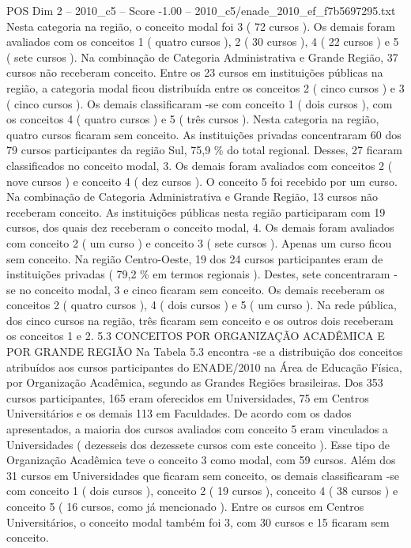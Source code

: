 \begin{textsample}{POS Dim 2 – 2010\_c5 – Score -1.00 – 2010\_c5/enade\_2010\_ef\_f7b5697295.txt}
Nesta categoria na região, o conceito modal foi 3 ( 72 cursos ).
Os demais foram avaliados com os conceitos 1 ( quatro cursos ), 2 ( 30 cursos ), 4 ( 22 cursos ) e 5 ( sete cursos ).
Na combinação de Categoria Administrativa e Grande Região, 37 cursos não receberam conceito.
Entre os 23 cursos em instituições públicas na região, a categoria modal ficou distribuída entre os conceitos 2 ( cinco cursos ) e 3 ( cinco cursos ).
Os demais classificaram -se com conceito 1 ( dois cursos ), com os conceitos 4 ( quatro cursos ) e 5 ( três cursos ).
Nesta categoria na região, quatro cursos ficaram sem conceito.
As instituições privadas concentraram 60 dos 79 cursos participantes da região Sul, 75,9 \% do total regional.
Desses, 27 ficaram classificados no conceito modal, 3.
Os demais foram avaliados com conceitos 2 ( nove cursos ) e conceito 4 ( dez cursos ).
O conceito 5 foi recebido por um curso.
Na combinação de Categoria Administrativa e Grande Região, 13 cursos não receberam conceito.
As instituições públicas nesta região participaram com 19 cursos, dos quais dez receberam o conceito modal, 4.
Os demais foram avaliados com conceito 2 ( um curso ) e conceito 3 ( sete cursos ).
Apenas um curso ficou sem conceito.
Na região Centro-Oeste, 19 dos 24 cursos participantes eram de instituições privadas ( 79,2 \% em termos regionais ).
Destes, sete concentraram -se no conceito modal, 3 e cinco ficaram sem conceito.
Os demais receberam os conceitos 2 ( quatro cursos ), 4 ( dois cursos ) e 5 ( um curso ).
Na rede pública, dos cinco cursos na região, três ficaram sem conceito e os outros dois receberam os conceitos 1 e 2. 5.3 CONCEITOS POR ORGANIZAÇÃO ACADÊMICA E POR GRANDE REGIÃO Na Tabela 5.3 encontra -se a distribuição dos conceitos atribuídos aos cursos participantes do ENADE/2010 na Área de Educação Física, por Organização Acadêmica, segundo as Grandes Regiões brasileiras.
Dos 353 cursos participantes, 165 eram oferecidos em Universidades, 75 em Centros Universitários e os demais 113 em Faculdades.
De acordo com os dados apresentados, a maioria dos cursos avaliados com conceito 5 eram vinculados a Universidades ( dezesseis dos dezessete cursos com este conceito ).
Esse tipo de Organização Acadêmica teve o conceito 3 como modal, com 59 cursos.
Além dos 31 cursos em Universidades que ficaram sem conceito, os demais classificaram -se com conceito 1 ( dois cursos ), conceito 2 ( 19 cursos ), conceito 4 ( 38 cursos ) e conceito 5 ( 16 cursos, como já mencionado ).
Entre os cursos em Centros Universitários, o conceito modal também foi 3, com 30 cursos e 15 ficaram sem conceito.

\end{textsample}
